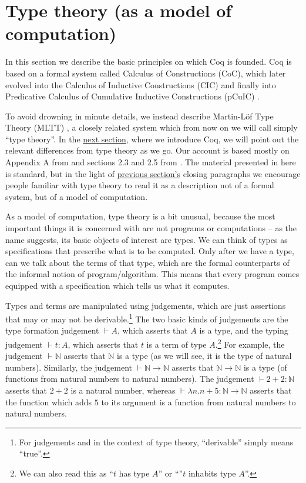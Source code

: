 \documentclass[declaration,mgr,english,shortabstract]{iithesis}
\newcommand{\type}[2]{#1 \vdash #2}
\newcommand{\term}[3]{#1 \vdash #2 : #3}
\newcommand{\N}{\mathbb{N}}
\begin{document}
\section{Type theory (as a model of computation)} \label{mltt}

In this section we describe the basic principles on which Coq is founded. Coq is based on a formal system called Calculus of Constructions (CoC)\cite{CoC}, which later evolved into the Calculus of Inductive Constructions (CIC) \cite{CIC} and finally into Predicative Calculus of Cumulative Inductive Constructions (pCuIC) \cite{pCuIC}.

To avoid drowning in minute details, we instead describe Martin-L\"{o}f Type Theory (MLTT) \cite{MLTT1} \cite{MLTT2}, a closely related system which from now on we will call simply ``type theory''. In the \hyperref[coq]{next section}, where we introduce Coq, we will point out the relevant differences from type theory as we go. Our account is based mostly on Appendix A from \cite{HoTTBook} and sections 2.3 and 2.5 from \cite{Overlapping}. The material presented in here is standard, but in the light of \hyperref[formal]{previous section's} closing paragraphs we encourage people familiar with type theory to read it as a description not of a formal system, but of a model of computation.

As a model of computation, type theory is a bit unusual, because the most important things it is concerned with are not programs or computations -- as the name suggests, its basic objects of interest are types. We can think of types as specifications that prescribe what is to be computed. Only after we have a type, can we talk about the terms of that type, which are the formal counterparts of the informal notion of program/algorithm. This means that every program comes equipped with a specification which tells us what it computes.

Types and terms are manipulated using judgements, which are just assertions that may or may not be derivable.\footnote{For judgements and in the context of type theory, ``derivable'' simply means ``true''.} The two basic kinds of judgements are the type formation judgement $\type{}{A}$, which asserts that $A$ is a type, and the typing judgement $\term{}{t}{A}$, which asserts that $t$ is a term of type $A$.\footnote{We can also read this as ``$t$ has type $A$'' or ``''$t$ inhabits type $A$''.} For example, the judgement $\type{}{\N}$ asserts that $\N$ is a type (as we will see, it is the type of natural numbers). Similarly, the judgement $\type{}{\N \to \N}$ asserts that $\N \to \N$ is a type (of functions from natural numbers to natural numbers). The judgement $\term{}{2 + 2}{\N}$ asserts that $2 + 2$ is a natural number, whereas $\term{}{\lambda n. n + 5}{\N \to \N$} asserts that the function which adds $5$ to its argument is a function from natural numbers to natural numbers.
\end{document}

